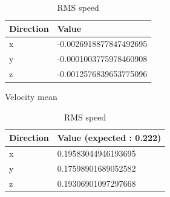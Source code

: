 \documentclass[a4paper,12pt]{article}
\theoremstyle{definition}
\begin{document}
\begin{table}[h]
\centering
\begin{minipage}{0.45\textwidth}
\centering
\begin{tabular}{ll}
\toprule
\textbf{Direction} & \textbf{Value} \\
\midrule
x & -0.0026918877847492695 \\
y & -0.0001003775978460908 \\
z & -0.0012576839653775096 \\
\bottomrule
\end{tabular}
\caption{Velocity mean}
\label{BaseMean}
\end{minipage}
\hfill
\begin{minipage}{0.45\textwidth}
\centering
\begin{tabular}{ll}
\toprule
\textbf{Direction} & \textbf{Value (expected : 0.222)} \\
\midrule
x & 0.19583044946193695 \\
y & 0.17598901689052582 \\
z & 0.19306901097297668 \\
\bottomrule
\end{tabular}
\caption{RMS speed}
\label{BaseRMSspeed}
\end{minipage}
\end{table}
\end{document}
